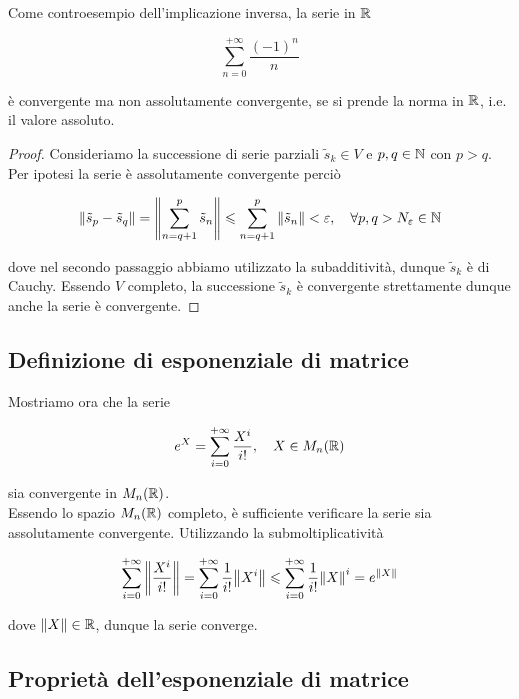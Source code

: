 Come controesempio dell'implicazione inversa, la serie in $ \mathbb{R} $

\begin{equation}
	\sum_{n=0}^{+\infty} \dfrac{(-1)^{n}}{n}
\end{equation}

è convergente ma non assolutamente convergente, se si prende la norma in $ \mathbb{R} $, i.e. il valore assoluto.

\begin{proof}
	Consideriamo la successione di serie parziali $ \tilde{s}_{k} \in V $ e $ p,q \in \mathbb{N} $ con $ p > q $. Per ipotesi la serie è assolutamente convergente perciò
	
	\begin{equation}
		\norm{\tilde{s}_{p} - \tilde{s}_{q}} = \norm{ \sum_{n=q+1}^{p} \tilde{s}_{n} } \leqslant \sum_{n=q+1}^{p} \norm{\tilde{s}_{n}} < \varepsilon \qcomma \forall p,q > N_{\varepsilon} \in \N
	\end{equation}

	dove nel secondo passaggio abbiamo utilizzato la subadditività, dunque $ \tilde{s}_{k} $ è di Cauchy. Essendo $ V $ completo, la successione $ \tilde{s}_{k} $ è convergente strettamente dunque anche la serie è convergente.
\end{proof}

\subsection{Definizione di esponenziale di matrice}

Mostriamo ora che la serie

\begin{equation}
	e^{X} = \sum_{i=0}^{+\infty} \dfrac{X^{i}}{i!} \qcomma X \in M_{n}(\R)
\end{equation}

sia convergente in $ M_{n}(\mathbb{R}) $.\\
Essendo lo spazio $ M_{n}(\mathbb{R}) $ completo, è sufficiente verificare la serie sia assolutamente convergente. Utilizzando la submoltiplicatività

\begin{equation}
	\sum_{i=0}^{+\infty} \norm{ \dfrac{X^{i}}{i!} } = %
	\sum_{i=0}^{+\infty} \dfrac{1}{i!} \norm{X^{i}} \leqslant %
	\sum_{i=0}^{+\infty} \dfrac{1}{i!} \norm{X}^{i} = %
	e^{\norm{X}}
\end{equation}

dove $ \norm{X} \in \mathbb{R} $, dunque la serie converge.

\subsection{Proprietà dell'esponenziale di matrice}

